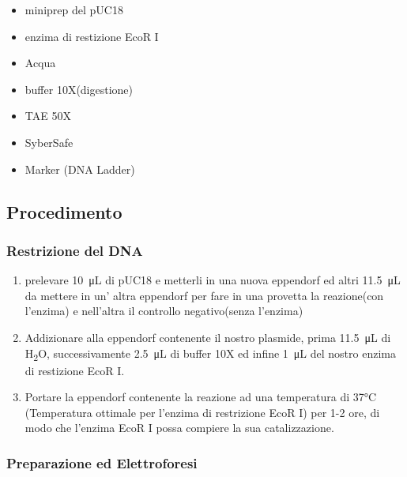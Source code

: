 \begin{itemize}

	\item miniprep del pUC18
	\item enzima di restizione EcoR I
	\item Acqua
	\item buffer 10X(digestione)
	\item TAE 50X
	\item SyberSafe
	\item Marker (DNA Ladder)

\end{itemize}

\subsection{Procedimento}

\subsubsection{Restrizione del DNA}

\begin{enumerate}

	\item prelevare  \SI{10}{\micro\liter} di pUC18 e metterli in una nuova eppendorf ed altri  \SI{11.5}{\micro\liter} da mettere in un' altra eppendorf per fare in una provetta la reazione(con l'enzima) e nell'altra il controllo negativo(senza l'enzima)

	\item Addizionare alla eppendorf contenente il nostro plasmide, prima \SI{11.5}{\micro\liter} di H\textsubscript{2}O, successivamente  \SI{2.5}{\micro\liter} di buffer 10X ed infine  \SI{1}{\micro\liter} del nostro enzima di restizione EcoR I.

	\item Portare la eppendorf contenente la reazione ad una temperatura di 37°C (Temperatura ottimale per l'enzima di restrizione EcoR I) per 1-2 ore, di modo che l'enzima EcoR I possa compiere la sua catalizzazione.

\end{enumerate}

\subsubsection{Preparazione ed Elettroforesi}


